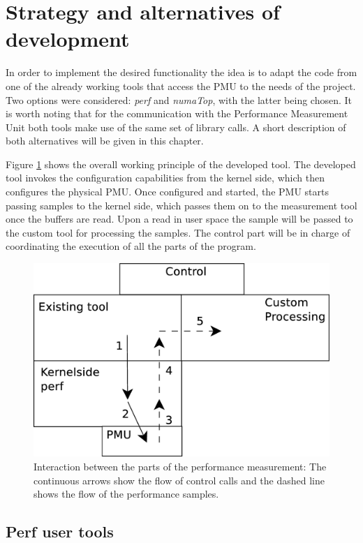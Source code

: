 \section{Strategy and alternatives of development}\label{section:strat}
In order to implement the desired functionality the idea is to adapt the code from one of the already working tools that access the PMU to the needs of the project. Two options were considered: \textit{perf} and \textit{numaTop}, with the latter being chosen. It is worth noting that for the communication with the Performance Measurement Unit both tools make use of the same set of library calls. A short description of both alternatives will be given in this chapter.

Figure \ref{fig:dstrategy} shows the overall working principle of the developed tool. The developed tool invokes the configuration capabilities from the kernel side, which then configures the physical PMU. Once configured and started, the PMU starts passing samples to the kernel side, which passes them on to the measurement tool once the buffers are read. Upon a read in user space the sample will be passed to the custom tool for processing the samples. The control part will be in charge of coordinating the execution of all the parts of the program.

\begin{figure}[ht]
	\centering
		\includegraphics[width=.8\textwidth]{figures/dev-strategy.eps}
		\caption[Flow of information in the development]{Interaction between the parts of the performance measurement: The continuous arrows show the flow of control calls and the dashed line shows the flow of the performance samples.}
		\label{fig:dstrategy}
\end{figure}
\subsection{Perf user tools}\label{section:perf-ut}

